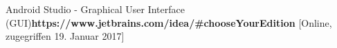   Android Studio - Graphical User Interface (GUI)\textbf{https://www.jetbrains.com/idea/#chooseYourEdition} [Online, zugegriffen 19. Januar 2017]
